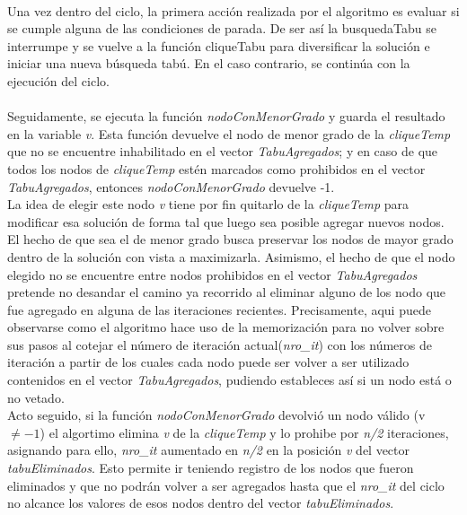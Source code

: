 \paragraph{}
Una vez dentro del ciclo, la primera acción realizada por el algoritmo es evaluar si se cumple alguna de las condiciones de parada. De ser así  la busquedaTabu se interrumpe y se vuelve a la función cliqueTabu para diversificar la solución e iniciar una nueva búsqueda tabú. En el caso contrario, se continúa con la ejecución del ciclo.

\paragraph{}
Seguidamente, se ejecuta la función \textit{nodoConMenorGrado} y guarda el resultado en la variable \textit{v}. Esta función devuelve el nodo de menor grado de la \textit{cliqueTemp} que no se encuentre inhabilitado en el vector \textit{TabuAgregados}; y en caso de que todos los nodos de \textit{cliqueTemp} estén marcados como prohibidos en el vector \textit{TabuAgregados}, entonces \textit{nodoConMenorGrado} devuelve -1. \\
La idea de elegir este nodo \textit{v} tiene por fin quitarlo de la \textit{cliqueTemp} para modificar esa solución de forma tal que luego sea posible agregar nuevos nodos. El hecho de que sea el de menor grado busca preservar los nodos de mayor grado dentro de la solución con vista a maximizarla. Asimismo, el hecho de que el nodo elegido no se encuentre entre nodos prohibidos en el vector \textit{TabuAgregados} pretende no desandar el camino ya recorrido al eliminar alguno de los nodo que fue agregado en alguna de las iteraciones recientes. Precisamente, aqui puede observarse como el algoritmo hace uso de la memorización para no volver sobre sus pasos al cotejar el número de iteración actual(\textit{nro\_it}) con los números de iteración a partir de los cuales cada nodo puede ser volver a ser utilizado contenidos en el vector \textit{TabuAgregados}, pudiendo estableces así si un nodo está o no vetado. \\
Acto seguido, si la función \textit{nodoConMenorGrado} devolvió un nodo válido (v $\neq -1$) el algortimo elimina \textit{v} de la \textit{cliqueTemp} y lo prohibe por \textit{n/2} iteraciones, asignando para ello, \textit{nro\_it} aumentado en  \textit{n/2} en la posición \textit{v} del vector \textit{tabuEliminados}. Esto permite ir teniendo registro de los nodos que fueron eliminados y que no podrán volver a ser agregados hasta que el \textit{nro\_it} del ciclo no alcance los valores de esos nodos dentro del vector \textit{tabuEliminados}.

